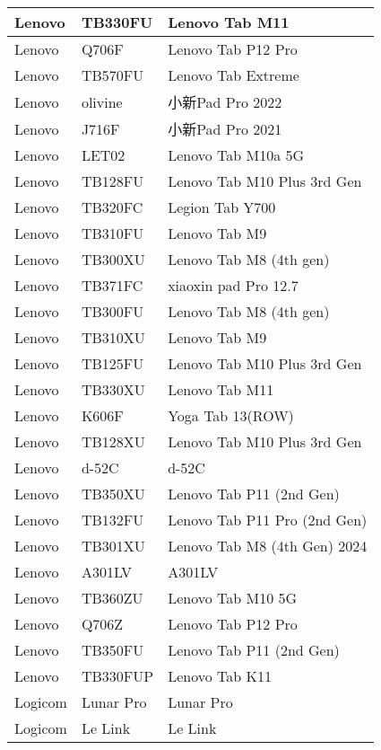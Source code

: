 \begin{tabularx}{\linewidth}{|l|X|X|}
        Lenovo & TB330FU & Lenovo Tab M11 \\ \hline
        Lenovo & Q706F & Lenovo Tab P12 Pro \\ \hline
        Lenovo & TB570FU & Lenovo Tab Extreme \\ \hline
        Lenovo & olivine & 小新Pad Pro 2022 \\ \hline
        Lenovo & J716F & 小新Pad Pro 2021 \\ \hline
        Lenovo & LET02 & Lenovo Tab M10a 5G \\ \hline
        Lenovo & TB128FU & Lenovo Tab M10 Plus 3rd Gen \\ \hline
        Lenovo & TB320FC & Legion Tab Y700 \\ \hline
        Lenovo & TB310FU & Lenovo Tab M9 \\ \hline
        Lenovo & TB300XU & Lenovo Tab M8 (4th gen) \\ \hline
        Lenovo & TB371FC & xiaoxin pad Pro 12.7 \\ \hline
        Lenovo & TB300FU & Lenovo Tab M8 (4th gen) \\ \hline
        Lenovo & TB310XU & Lenovo Tab M9 \\ \hline
        Lenovo & TB125FU & Lenovo Tab M10 Plus 3rd Gen \\ \hline
        Lenovo & TB330XU & Lenovo Tab M11 \\ \hline
        Lenovo & K606F & Yoga Tab 13(ROW) \\ \hline
        Lenovo & TB128XU & Lenovo Tab M10 Plus 3rd Gen \\ \hline
        Lenovo & d-52C & d-52C \\ \hline
        Lenovo & TB350XU & Lenovo Tab P11 (2nd Gen) \\ \hline
        Lenovo & TB132FU & Lenovo Tab P11 Pro (2nd Gen) \\ \hline
        Lenovo & TB301XU & Lenovo Tab M8 (4th Gen) 2024 \\ \hline
        Lenovo & A301LV & A301LV \\ \hline
        Lenovo & TB360ZU & Lenovo Tab M10 5G \\ \hline
        Lenovo & Q706Z & Lenovo Tab P12 Pro \\ \hline
        Lenovo & TB350FU & Lenovo Tab P11 (2nd Gen) \\ \hline
        Lenovo & TB330FUP & Lenovo Tab K11 \\ \hline
        Logicom & Lunar Pro & Lunar Pro \\ \hline
        Logicom & Le Link & Le Link \\ \hline

\end{tabularx}
